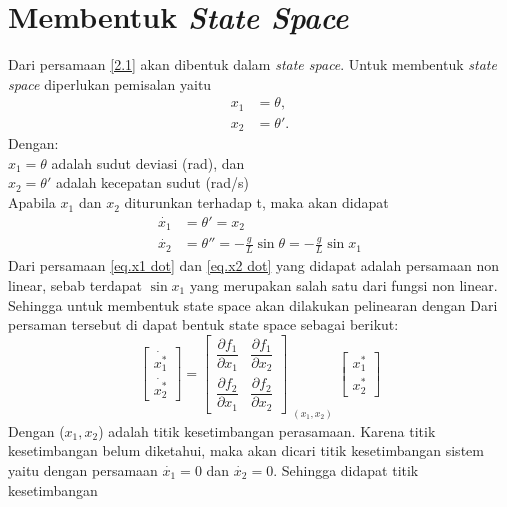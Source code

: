 \documentclass{article}
\begin{document}
\section{Membentuk \textit{State Space}}
Dari persamaan \eqref{2.1} akan dibentuk dalam \textit{state space}. Untuk membentuk \textit{state space} diperlukan pemisalan yaitu
\begin{equation} \label{eq:x1 x2 theta_defined}
    \begin{aligned}
        x_1 & = \theta,  \\
        x_2 & = \theta'.
    \end{aligned}
\end{equation}
Dengan: \\
$ x_1 = \theta$ adalah sudut deviasi (rad), dan  \\
$x_2 = \theta'$ adalah kecepatan sudut (rad/s) \\
Apabila $x_1$ dan $x_2$ diturunkan terhadap t, maka akan didapat
\begin{align}
    \dot{x_1} & = \theta' = x_2 \label{eq.x1 dot}                                               \\
    \dot{x_2} & = \theta'' = -\frac{g}{L} \sin \theta = -\frac{g}{L} \sin x_1 \label{eq.x2 dot}
\end{align}
Dari persamaan \eqref{eq.x1 dot} dan \eqref{eq.x2 dot} yang didapat adalah persamaan non linear, sebab terdapat $\sin x_1$ yang merupakan salah satu dari fungsi non linear. Sehingga untuk membentuk state space akan dilakukan pelinearan dengan Dari persaman tersebut di dapat bentuk state space sebagai berikut: \\
\[
    \begin{bmatrix}
        \dot{x_1^*} \\
        \dot{x_2^*}
    \end{bmatrix}
    = \begin{bmatrix}
        \dfrac{\partial f_1}{\partial x_1} & \dfrac{\partial f_1}{\partial x_2} \\
        \dfrac{\partial f_2}{\partial x_1} & \dfrac{\partial f_2}{\partial x_2}
    \end{bmatrix} _{\substack{(x_1, x_2)}}
    \begin{bmatrix}
        x_1^* \\
        x_2^*
    \end{bmatrix}
\]
Dengan ($x_1,x_2$) adalah titik kesetimbangan perasamaan. Karena titik kesetimbangan belum diketahui, maka akan dicari titik kesetimbangan sistem yaitu dengan persamaan $\dot{x_1} = 0$ dan $\dot{x_2} = 0$. Sehingga didapat titik kesetimbangan
\end{document}
